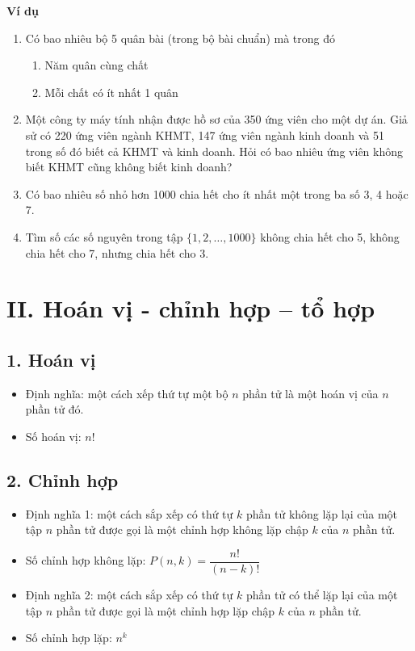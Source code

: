 \documentclass[12pt,a4paper]{article}
\begin{document}
\textbf{Ví dụ}
\begin{enumerate}
    \item Có bao nhiêu bộ 5 quân bài (trong bộ bài chuẩn) mà trong đó
    \begin{enumerate}[label=\alph*.]
        \item Năm quân cùng chất
        \item Mỗi chất có ít nhất 1 quân
    \end{enumerate}
    \item Một công ty máy tính nhận được hồ sơ của 350 ứng viên cho một dự án. Giả sử có 220 ứng viên ngành KHMT, 147 ứng viên ngành kinh doanh và 51 trong số đó biết cả KHMT và kinh doanh. Hỏi có bao nhiêu ứng viên không biết KHMT cũng không biết kinh doanh?
    \item Có bao nhiêu số nhỏ hơn 1000 chia hết cho ít nhất một trong ba số 3, 4 hoặc 7.
    \item Tìm số các số nguyên trong tập $\{1, 2, \dots, 1000\}$ không chia hết cho 5, không chia hết cho 7, nhưng chia hết cho 3.
\end{enumerate}

\hrulefill

\section*{II. Hoán vị - chỉnh hợp – tổ hợp}

\subsection*{1. Hoán vị}
\begin{itemize}
    \item Định nghĩa: một cách xếp thứ tự một bộ $n$ phần tử là một hoán vị của $n$ phần tử đó.
    \item Số hoán vị: $n!$
\end{itemize}

\subsection*{2. Chỉnh hợp}
\begin{itemize}
    \item Định nghĩa 1: một cách sắp xếp có thứ tự $k$ phần tử không lặp lại của một tập $n$ phần tử được gọi là một chỉnh hợp không lặp chập $k$ của $n$ phần tử.
    \item Số chỉnh hợp không lặp: $P(n,k) = \dfrac{n!}{(n-k)!}$
    \item Định nghĩa 2: một cách sắp xếp có thứ tự $k$ phần tử có thể lặp lại của một tập $n$ phần tử được gọi là một chỉnh hợp lặp chập $k$ của $n$ phần tử.
    \item Số chỉnh hợp lặp: $n^k$
\end{itemize}
\end{document}

